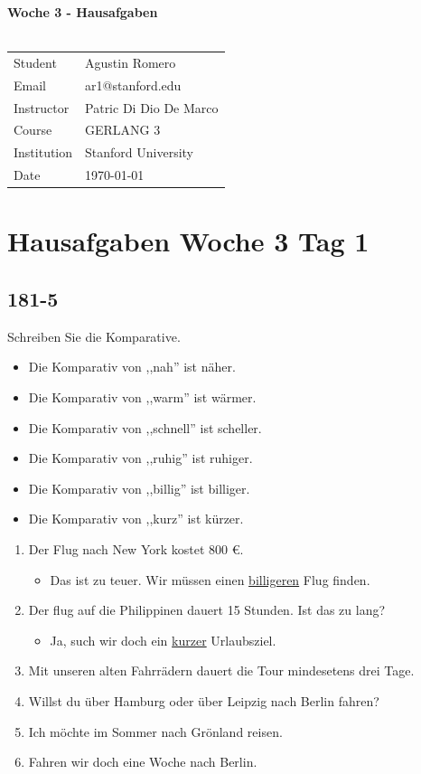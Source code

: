 \documentclass{article}
\begin{document}
\begin{center}
\textbf{\Large{Woche 3 - Hausafgaben}}\\~\\
\begin{tabular}{l l}
Student&Agustin Romero\\
Email&ar1@stanford.edu\\
Instructor&Patric Di Dio De Marco\\
Course&GERLANG 3\\
Institution&Stanford University\\
Date&\today\\
\end{tabular}
\end{center}
\section*{Hausafgaben Woche 3 Tag 1}
\subsection*{181-5}
Schreiben Sie die Komparative.
\begin{itemize}
\item Die Komparativ von ,,nah'' ist näher.
\item Die Komparativ von ,,warm'' ist wärmer.
\item Die Komparativ von ,,schnell'' ist scheller.
\item Die Komparativ von ,,ruhig'' ist ruhiger.
\item Die Komparativ von ,,billig'' ist billiger.
\item Die Komparativ von ,,kurz'' ist kürzer.
\end{itemize}
\begin{enumerate}[label=(\alph*)]
\item Der Flug nach New York kostet 800 €. 
\begin{itemize}
\item Das ist zu teuer. Wir müssen einen \underline{billigeren} Flug finden.
\end{itemize}
\item Der flug auf die Philippinen dauert 15 Stunden. Ist das zu lang?
\begin{itemize}
\item Ja, such wir doch ein \underline{kurzer} Urlaubsziel.
\end{itemize}
\item Mit unseren alten Fahrrädern dauert die Tour mindesetens drei Tage.
\item Willst du über Hamburg oder über Leipzig nach Berlin fahren?
\item Ich möchte im Sommer nach Grönland reisen.
\item Fahren wir doch eine Woche nach Berlin.
\end{enumerate}
\end{document}
